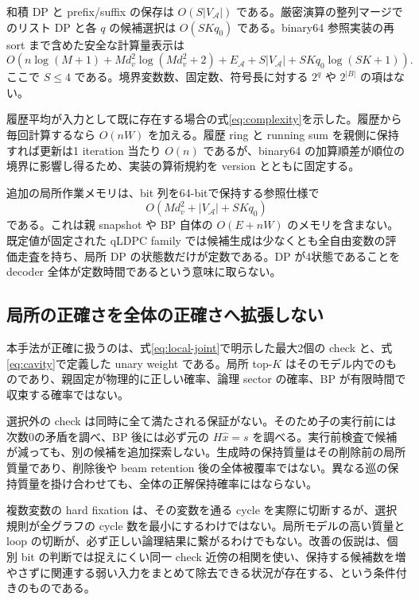 \documentclass[a4paper,11pt]{ltjsarticle}
\numberwithin{equation}{section}
\theoremstyle{definition}
\newcommand{\A}{\mathcal A}
\begin{document}
和積 DP と prefix/suffix の保存は $O(S|V_\A|)$ である。厳密演算の整列マージでのリスト DP と各 $q$ の候補選択は $O(SKq_0)$ である。binary64 参照実装の再 sort まで含めた安全な計算量表示は
\begin{equation}
 O\!\left(
 n\log(M+1)+Md_v^2\log(Md_v^2+2)
 +E_\A+S|V_\A|+SKq_0\log(SK+1)
 \right).
 \label{eq:complexity}
\end{equation}
ここで $S\le4$ である。境界変数数、固定数、符号長に対する $2^q$ や $2^{|B|}$ の項はない。

履歴平均が入力として既に存在する場合の式\eqref{eq:complexity}を示した。履歴から毎回計算するなら $O(nW)$ を加える。履歴 ring と running sum を親側に保持すれば更新は1 iteration 当たり $O(n)$ であるが、binary64 の加算順差が順位の境界に影響し得るため、実装の算術規約を version とともに固定する。

追加の局所作業メモリは、bit 列を64-bitで保持する参照仕様で
\begin{equation}
 O(Md_v^2+|V_\A|+SKq_0)
\end{equation}
である。これは親 snapshot や BP 自体の $O(E+nW)$ のメモリを含まない。既定値が固定された qLDPC family では候補生成は少なくとも全自由変数の評価走査を持ち、局所 DP の状態数だけが定数である。DP が4状態であることを decoder 全体が定数時間であるという意味に取らない。

\subsection{局所の正確さを全体の正確さへ拡張しない}
本手法が正確に扱うのは、式\eqref{eq:local-joint}で明示した最大2個の check と、式\eqref{eq:cavity}で定義した unary weight である。局所 top-$K$ はそのモデル内でのものであり、親固定が物理的に正しい確率、論理 sector の確率、BP が有限時間で収束する確率ではない。

選択外の check は同時に全て満たされる保証がない。そのため子の実行前には次数0の矛盾を調べ、BP 後には必ず元の $H\hat x=s$ を調べる。実行前検査で候補が減っても、別の候補を追加探索しない。生成時の保持質量はその削除前の局所質量であり、削除後や beam retention 後の全体被覆率ではない。異なる巡の保持質量を掛け合わせても、全体の正解保持確率にはならない。

複数変数の hard fixation は、その変数を通る cycle を実際に切断するが、選択規則が全グラフの cycle 数を最小にするわけではない。局所モデルの高い質量と loop の切断が、必ず正しい論理結果に繋がるわけでもない。改善の仮説は、個別 bit の判断では捉えにくい同一 check 近傍の相関を使い、保持する候補数を増やさずに関連する弱い入力をまとめて除去できる状況が存在する、という条件付きのものである。
\end{document}
